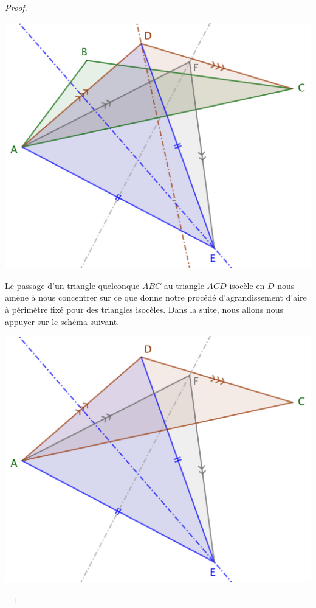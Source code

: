\begin{proof}
	\begin{center}
		\includegraphics[scale=.4]{content/triangle-gene/triangle-conj.png}
	\end{center} 

	
	Le passage d'un triangle quelconque $ABC$ au triangle $ACD$ isocèle en $D$ nous amène à nous concentrer sur ce que donne notre procédé d'agrandissement d'aire à périmètre fixé pour des triangles isocèles. 
	Dans la suite, nous allons nous appuyer sur le schéma suivant.
	
	\begin{center}
		\includegraphics[scale=.4]{content/triangle-gene/triangle-proof.png}
	\end{center} 
	

\end{proof}
